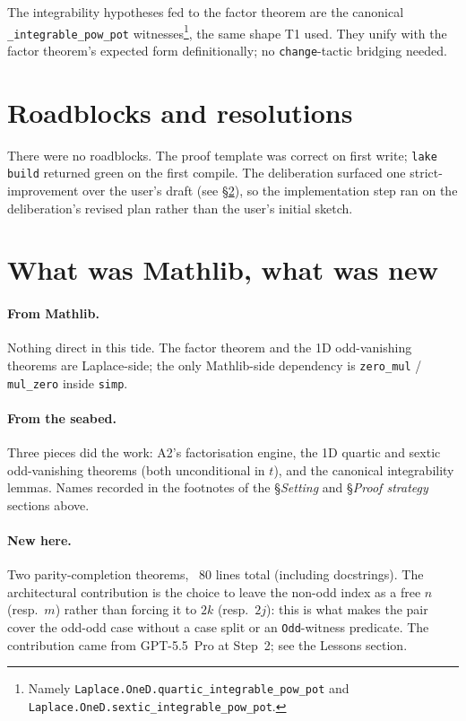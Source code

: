 \documentclass[11pt]{article}
\begin{document}
The integrability hypotheses fed to the factor theorem are the
canonical \texttt{\_integrable\_pow\_pot} witnesses\footnote{Namely
\texttt{Laplace.OneD.quartic\_integrable\_pow\_pot} and
\texttt{Laplace.OneD.sextic\_integrable\_pow\_pot}.}, the same shape
T1 used. They unify with the factor theorem's expected form
definitionally; no \texttt{change}-tactic bridging needed.

\section{Roadblocks and resolutions}

There were no roadblocks. The proof template was correct on first
write; \texttt{lake build} returned green on the first compile. The
deliberation surfaced one strict-improvement over the user's draft
(see \S\ref{sec:gpt}), so the implementation step ran on the
deliberation's revised plan rather than the user's initial sketch.

\section{What was Mathlib, what was new}\label{sec:gpt}

\paragraph{From Mathlib.} Nothing direct in this tide. The factor
theorem and the 1D odd-vanishing theorems are Laplace-side; the
only Mathlib-side dependency is \texttt{zero\_mul} / \texttt{mul\_zero}
inside \texttt{simp}.

\paragraph{From the seabed.} Three pieces did the work: A2's
factorisation engine, the 1D quartic and sextic odd-vanishing
theorems (both unconditional in $t$), and the canonical
integrability lemmas. Names recorded in the footnotes of the
\S\emph{Setting} and \S\emph{Proof strategy} sections above.

\paragraph{New here.} Two parity-completion theorems, ~80 lines total
(including docstrings). The architectural contribution is the choice
to leave the non-odd index as a free $n$ (resp.\ $m$) rather than
forcing it to $2k$ (resp.\ $2j$): this is what makes the pair cover
the odd-odd case without a case split or an \texttt{Odd}-witness
predicate. The contribution came from GPT-5.5~Pro at Step~2; see the
Lessons section.
\end{document}
